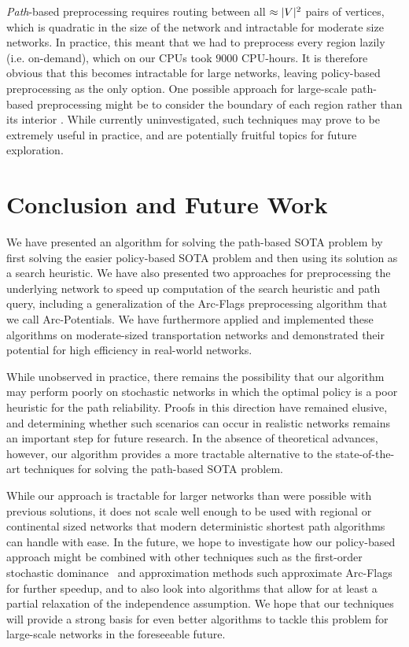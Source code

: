 \documentclass[oribibl]{llncs}
\DeclarePairedDelimiter{\abs}{\lvert}{\rvert}
\begin{document}
			\textit{Path}-based preprocessing requires routing between all $\approx\abs{V}^2$ pairs of vertices,
			which is quadratic in the size of the network and intractable for moderate size networks.
			In practice, this meant that we had to preprocess every region lazily (i.e. on-demand),
			which on our CPUs took $9000$ CPU-hours.
			It is therefore obvious that this becomes intractable for large networks, leaving
			policy-based preprocessing as the only option.
			One possible approach for large-scale path-based preprocessing might be to
			consider the boundary of each region rather than its interior \cite{sabran2014precomputation}.
			While currently uninvestigated, such techniques may prove to be extremely useful in practice,
			and are potentially fruitful topics for future exploration.

	\section{Conclusion and Future Work}

		We have presented an algorithm for solving the path-based SOTA problem by first
		solving the easier policy-based SOTA problem and then using its solution as a search heuristic.
		We have also presented two approaches for preprocessing the underlying network to speed up computation of
		the search heuristic and path query,
		including a generalization of the Arc-Flags preprocessing algorithm that we call Arc-Potentials.
		We have furthermore applied and implemented these algorithms on moderate-sized transportation
		networks and demonstrated their potential for high efficiency in real-world networks.

		While unobserved in practice, there remains the possibility that our algorithm
		may perform poorly on stochastic networks
		in which the optimal policy is a poor heuristic for the path reliability.
		Proofs in this direction have remained elusive, and determining whether
		such scenarios can occur in realistic networks remains an important step for future research.
		In the absence of theoretical advances, however, our algorithm provides a more tractable
		alternative to the state-of-the-art techniques for solving the path-based SOTA problem.

		While our approach is tractable for larger
		networks than were possible with previous solutions, it does not scale well enough
		to be used with regional or continental sized networks that modern deterministic shortest
		path algorithms can handle with ease.
		In the future, we hope to investigate how our policy-based approach
		might be combined with other techniques such as
		the first-order stochastic dominance~\cite{nie2009shortest} and approximation methods such
		approximate Arc-Flags~\cite{sabran2014precomputation} for further speedup,
		and to also look into algorithms that allow for at least a partial relaxation of the
		independence assumption.
		We hope that our techniques will provide a strong basis for even better algorithms
		to tackle this problem for large-scale networks in the foreseeable future.

	
	
\end{document}

